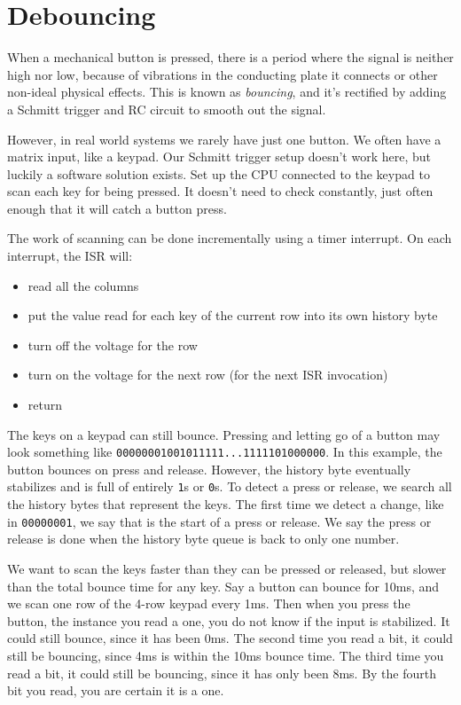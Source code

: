 \section{Debouncing}

When a mechanical button is pressed, there is a
period where the signal is neither high nor low,
because of vibrations in the conducting plate it
connects or other non-ideal physical effects. This
is known as \emph{bouncing}, and it's rectified by
adding a Schmitt trigger and RC circuit to smooth
out the signal.

However, in real world systems we rarely have just one
button. We often have a matrix input, like a keypad.
Our Schmitt trigger setup doesn't work here, but
luckily a software solution exists. Set up the CPU
connected to the keypad to scan each key for being pressed.
It doesn't need to check constantly, just often enough that
it will catch a button press.

The work of scanning can be done incrementally using a timer interrupt.
On each interrupt, the ISR will:
\begin{itemize}
    \item read all the columns
    \item put the value read for each key of the current row into its own history byte
    \item turn off the voltage for the row
    \item turn on the voltage for the next row (for the next ISR invocation)
    \item return
\end{itemize}

The keys on a keypad can still bounce. Pressing and letting go of a
button may look something like \texttt{00000001001011111...1111101000000}.
In this example, the button bounces on press and release. However, the
history byte eventually stabilizes and is full of entirely \texttt{1}s
or \texttt{0}s. To detect a press or release, we search all the history
bytes that represent the keys. The first time we detect a change, like in
\texttt{00000001}, we say that is the start of a press or release. We say
the press or release is done when the history byte queue is back to only
one number.

We want to scan the keys faster than they can be pressed or released, but
slower than the total bounce time for any key. Say a button can bounce for
10ms, and we scan one row of the 4-row keypad every 1ms. Then when you
press the button, the instance you read a one, you do not know if the
input is stabilized. It could still bounce, since it has been 0ms.
The second time you read a bit, it could still be bouncing, since 4ms is
within the 10ms bounce time. The third time you read a bit, it could still
be bouncing, since it has only been 8ms. By the fourth bit you read, you are
certain it is a one.

